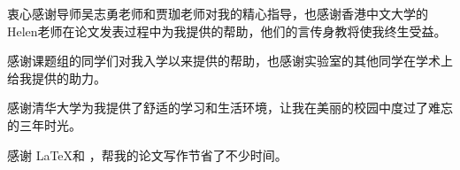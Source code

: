 \begin{acknowledgement}
  衷心感谢导师吴志勇老师和贾珈老师对我的精心指导，也感谢香港中文大学的Helen老师在论文发表过程中为我提供的帮助，他们的言传身教将使我终生受益。

  感谢课题组的同学们对我入学以来提供的帮助，也感谢实验室的其他同学在学术上给我提供的助力。

  感谢清华大学为我提供了舒适的学习和生活环境，让我在美丽的校园中度过了难忘的三年时光。

  感谢 \LaTeX 和 \thuthesis\cite{thuthesis}，帮我的论文写作节省了不少时间。
\end{acknowledgement}
